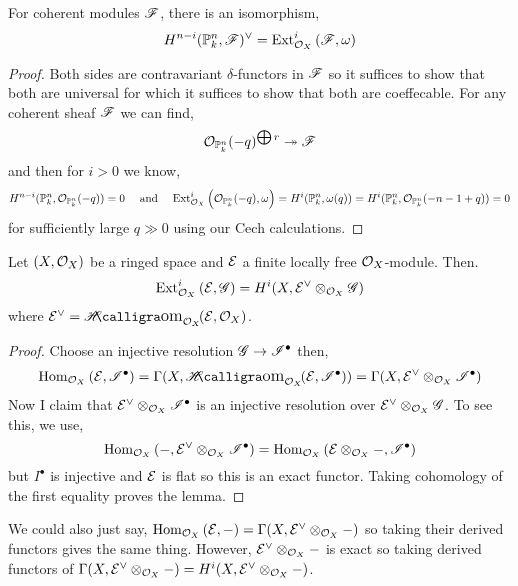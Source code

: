 \documentclass[12pt]{article}
\begin{document}
\begin{thm}
For coherent modules $\mathscr{F}$, there is an isomorphism,
\[ H^{n-i}(\mathbb{P}^n_k, \mathscr{F})^\vee = \mathrm{Ext}^{i}_{\mathcal{O}_{X}} \left( \mathscr{F}, \omega \right) \]
\end{thm}

\begin{proof}
Both sides are contravariant $\delta$-functors in $\mathscr{F}$ so it suffices to show that both are universal for which it suffices to show that both are coeffecable. For any coherent sheaf $\mathscr{F}$ we can find,
\[ \mathcal{O}_{\mathbb{P}^n_k}(-q)^{\bigoplus r} \twoheadrightarrow \mathscr{F} \]
and then for $i > 0$ we know,
\[ H^{n-i}(\mathbb{P}^n_k, \mathcal{O}_{\mathbb{P}^n_k}(-q)) = 0 \quad \text{ and } \quad \mathrm{Ext}^{i}_{\mathcal{O}_{X}} \left( \mathcal{O}_{\mathbb{P}^n_k}(-q), \omega \right) =  H^i(\mathbb{P}^n_k, \omega(q)) = H^i(\mathbb{P}^n_k, \mathcal{O}_{\mathbb{P}^n_k}(-n-1 + q)) = 0 \]
for sufficiently large $q \gg 0$ using our Cech calculations.
\end{proof}

\begin{lemma}
Let $(X, \mathcal{O}_{X})$ be a ringed space and $\mathcal{E}$ a finite locally free $\mathcal{O}_{X}$-module. Then.
\[ \mathrm{Ext}^{i}_{\mathcal{O}_{X}} \left( \mathcal{E}, \mathscr{G} \right) = H^i(X, \mathcal{E}^\vee \otimes_{\mathcal{O}_{X}} \mathscr{G}) \]
where $\E^\vee = \shHom{\struct{X}}{\E}{\struct{X}}$.
\end{lemma}

\begin{proof}
Choose an injective resolution $\mathscr{G} \to \mathscr{I}^\bullet$ then,
\begin{align*}
\Hom{\struct{X}}{\E}{\I^\bullet} = \Gamma(X, \shHom{\struct{X}}{\E}{\I^\bullet}) = \Gamma(X, \E^\vee \otimes_{\struct{X}} \I^\bullet)
\end{align*}
Now I claim that $\mathcal{E}^\vee \otimes_{\mathcal{O}_{X}} \mathscr{I}^\bullet$ is an injective resolution over $\mathcal{E}^\vee \otimes_{\mathcal{O}_{X}} \mathscr{G}$. To see this, we use,
\[ \mathrm{Hom}_{\mathcal{O}_{X}} \left( -, \mathcal{E}^\vee \otimes_{\mathcal{O}_{X}} \mathscr{I}^\bullet \right) = \mathrm{Hom}_{\mathcal{O}_{X}} \left( \mathcal{E} \otimes_{\mathcal{O}_{X}} -, \mathscr{I}^\bullet \right) \]
but $I^\bullet$ is injective and $\mathcal{E}$ is flat so this is an exact functor. Taking cohomology of the first equality proves the lemma.
\end{proof}

\begin{rmk}
We could also just say, $\mathrm{Hom}_{\mathcal{O}_{X}} \left( \mathcal{E}, - \right) = \Gamma(X, \mathcal{E}^\vee \otimes_{\mathcal{O}_{X}} - )$ so taking their derived functors gives the same thing. However, $\mathcal{E}^\vee \otimes_{\mathcal{O}_{X}} - $ is exact so taking derived functors of $\Gamma(X, \mathcal{E}^\vee \otimes_{\mathcal{O}_{X}} - ) = H^i(X, \mathcal{E}^\vee \otimes_{\mathcal{O}_{X}} - )$. 
\end{rmk}
\end{document}

